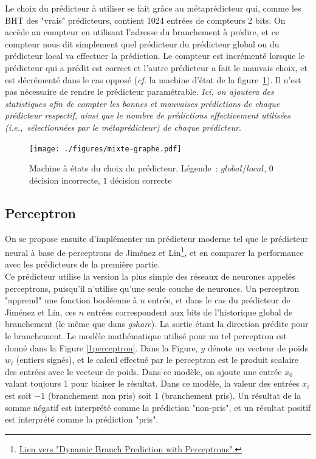 \documentclass[a4paper]{article}
\begin{document}
\begin{enumerate}
Le choix du prédicteur à utiliser se fait grâce au métaprédicteur qui, comme les BHT des "vrais" prédicteurs, contient 1024 entrées de compteurs 2 bits. On accède au compteur en utilisant l'adresse du branchement à prédire, et ce compteur nous dit simplement quel prédicteur du prédicteur global ou du prédicteur local va effectuer la prédiction. Le compteur est incrémenté lorsque le prédicteur qui a prédit est correct et l'autre prédicteur a fait le mauvais choix, et est décrémenté dans le cas opposé (\emph{cf.} la machine d'état de la figure~\ref{mixte-graphe}). Il n'est pas nécessaire de rendre le prédicteur paramétrable. \textit{Ici, on ajoutera des statistiques afin de compter les bonnes et mauvaises prédictions de chaque prédicteur respectif, ainsi que le nombre de prédictions effectivement utilisées (i.e.,~sélectionnées par le métaprédicteur) de chaque prédicteur}.



\begin{figure}[hbt]\center\leavevmode
      \texttt{[image: ./figures/mixte-graphe.pdf]}
      \caption{Machine à états du choix du prédicteur.
      Légende~: $global/local$, $0$ décision incorrecte, $1$ décision correcte}
      \label{mixte-graphe}
      \end{figure}
\end{enumerate}


\subsection{Perceptron}

On se propose ensuite d'implémenter un prédicteur moderne tel que le prédicteur neural à base de perceptrons de Jiménez et Lin\footnote{\href{https://www.cs.cmu.edu/afs/cs/academic/class/15740-f18/www/papers/hpca01-jiminez-perceptron.pdf}{Lien vers "Dynamic Branch Prediction with Perceptrons".}}, et en comparer la performance avec les prédicteurs de la première partie. \\

Ce prédicteur utilise la version la plus simple des réseaux de neurones appelés perceptrons, puisqu'il n'utilise qu'une seule couche de neurones. Un perceptron "apprend" une fonction booléenne à $n$ entrée, et dans le cas du prédicteur de Jiménez et Lin, ces $n$ entrées correspondent aux bits de l'historique global de branchement (le même que dans \textit{gshare}). La sortie étant la direction prédite pour le branchement. Le modèle mathématique utilisé pour un tel perceptron est donné dans la Figure \ref{1perceptron}. Dans la Figure, $y$ dénote un vecteur de poids $w_i$ (entiers signés), et le calcul effectué par le perceptron est le produit scalaire des entrées avec le vecteur de poids. Dans ce modèle, on ajoute une entrée $x_0$ valant toujours 1 pour biaiser le résultat. Dans ce modèle, la valeur des entrées $x_i$ est soit $-1$ (branchement non pris) soit $1$ (branchement pris). Un résultat de la somme négatif est interprété comme la prédiction "non-pris", et un résultat positif est interprété comme la prédiction "pris".
\end{document}
